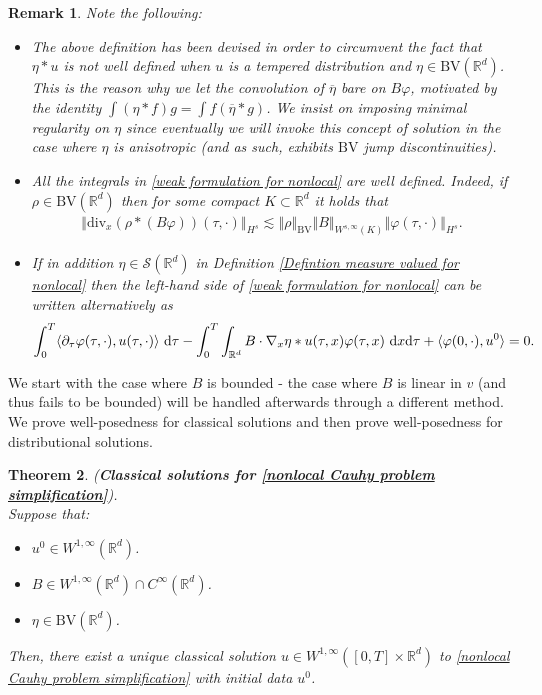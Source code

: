 \documentclass[11pt,reqno]{amsart}
\newtheorem{thm}{Theorem}[section]
\newtheorem{rem}[thm]{Remark}
\numberwithin{equation}{section}
\def\dd{{\rm d}}
\begin{document}
\begin{rem}
Note the following: 
\begin{itemize}
\item The above definition has been devised in order to circumvent the fact that $\eta\ast u$ is not well defined when $u$ is a tempered distribution and $\eta\in \mathrm{BV}(\mathbb{R}^{d})$. This is the reason why we let the convolution of $\overline{\eta}$ bare on $B\varphi$, motivated by the identity $\int (\eta\ast f) g=\int f(\overline{\eta}\ast g)$. We insist on imposing minimal regularity on $\eta$ since eventually we will invoke this concept of solution in the case where $\eta$ is anisotropic (and as such, exhibits $\mathrm{BV}$ jump discontinuities). 
\item All the integrals in  \eqref{weak formulation for nonlocal} are well defined. Indeed, if $\rho\in \mathrm{BV}(\mathbb{R}^{d})$ then for some compact $K\subset \mathbb{R}^{d}$ it holds that   
\begin{align*}
\left\Vert \mathrm{div}_{x}(\rho\ast (B\varphi))(\tau,\cdot)\right\Vert_{H^{s}}\lesssim \left\Vert \rho\right\Vert_{\mathrm{BV}}\left\Vert B\right\Vert_{W^{s,\infty}(K)} \left\Vert \varphi(\tau,\cdot)\right\Vert_{H^{s}}.   \end{align*}
\item If in addition $\eta\in\mathcal{S}(\mathbb{R}^{d})$ in Definition \ref{Defintion measure valued for nonlocal} then the left-hand side of \eqref{weak formulation for nonlocal} can be written alternatively as 
\begin{align*}
\int_{0}^{T}\langle \partial_{\tau}\varphi(\tau,\cdot), u(\tau,\cdot)\rangle\ \dd \tau -\int_{0}^{T}\int_{\mathbb{R}^{d}}B\cdot \nabla_{x}\eta\ast  u(\tau,x)\varphi(\tau,x)\ \dd x\dd \tau+\langle \varphi(0,\cdot), u^{0}\rangle=0.
\end{align*}
\end{itemize}
\end{rem}
We start with the case where $B$ is bounded - the case where $B$  is linear in $v$ (and thus fails to be bounded) will be handled afterwards through a different method. We prove well-posedness for classical solutions and then prove well-posedness for distributional solutions. 
\begin{thm} \textup{(\textbf{Classical solutions for \eqref{nonlocal Cauhy problem simplification}}).}
\label{wellposedness classical sol}
\\
Suppose that: 
\begin{itemize}
\item $u^{0}\in W^{1,\infty}(\mathbb{R}^{d})$.
\item $B\in W^{1,\infty}( \mathbb{R}^{d})\cap C^{\infty}(\mathbb{R}^{d})$. 
\item $\eta\in  \mathrm{BV}(\mathbb{R}^{d})$.
\end{itemize}
Then, there exist a unique classical solution $u\in W^{1,\infty}([0,T]\times \mathbb{R}^{d})$ to \eqref{nonlocal Cauhy problem simplification} with initial data $u^{0}$. 
\end{thm}
\end{document}

